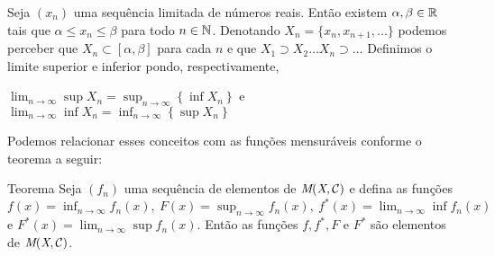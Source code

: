 Seja $(x_n)$ uma sequência limitada de números reais.
Então existem $\alpha, \beta \in \mathbb{R}$ tais que $\alpha \leq x_n \leq \beta$ para todo $n \in \operatorname{\mathbb{N}}$.
Denotando $X_n =\{x_n, x_{n+1}, ...\}$ podemos perceber que 
$X_n \subset [\alpha, \beta]$ para cada $n$ e que $X_1 \supset X_2 \ldots X_n \supset \ldots$
Definimos o limite superior e inferior pondo, respectivamente, 
\begin{center}
	$\displaystyle
	\lim_{n \to \infty}\sup X_n 
	=\sup_{n \to \infty} \left\{\inf X_n\right\}
	$
	e
	$\displaystyle
	\lim_{n \to \infty}\inf X_n 
	=\inf_{n \to \infty} \left\{\sup X_n\right\}
	$
\end{center}
Podemos relacionar esses conceitos com as funções mensuráveis conforme o teorema a seguir:
\begin{env}{Teorema}
\label{teo:mensurabilidade-sequencia-funcoes-mensuraveis}
	Seja $(f_n)$ uma sequência de elementos de $\operatorname{\textit{M}(\textit{X}, \mathcal{C} )}$ e defina as funções
	$\displaystyle
	f(x) = \inf_{n \to \infty} f_n(x),\  
	F(x) = \sup_{n \to \infty} f_n(x),\  
	f^*(x) = \lim_{n \to \infty}\inf f_n(x)$ e
	$\displaystyle 
	F^*(x) = \lim_{n \to \infty}\sup f_n(x).$
	Então as funções $f, f^*, F$ e $F^*$ são elementos de $\operatorname{\textit{M}(\textit{X}, \mathcal{C} )}$.
\end{env}
